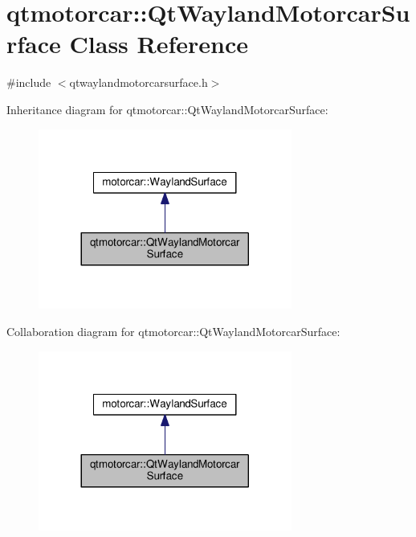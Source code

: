 \hypertarget{classqtmotorcar_1_1QtWaylandMotorcarSurface}{\section{qtmotorcar\-:\-:Qt\-Wayland\-Motorcar\-Surface Class Reference}
\label{classqtmotorcar_1_1QtWaylandMotorcarSurface}
}


{\ttfamily \#include $<$qtwaylandmotorcarsurface.\-h$>$}



Inheritance diagram for qtmotorcar\-:\-:Qt\-Wayland\-Motorcar\-Surface\-:
\nopagebreak
\begin{figure}[H]
\begin{center}
\leavevmode
\includegraphics[width=236pt]{classqtmotorcar_1_1QtWaylandMotorcarSurface__inherit__graph}
\end{center}
\end{figure}


Collaboration diagram for qtmotorcar\-:\-:Qt\-Wayland\-Motorcar\-Surface\-:
\nopagebreak
\begin{figure}[H]
\begin{center}
\leavevmode
\includegraphics[width=236pt]{classqtmotorcar_1_1QtWaylandMotorcarSurface__coll__graph}
\end{center}
\end{figure}

